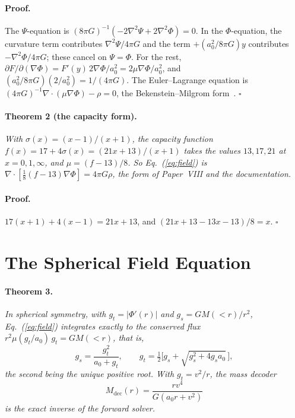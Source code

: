 \documentclass[twocolumn]{iopjournal}
\begin{document}
\paragraph{Proof.} The $\Psi$-equation is
$(8\pi G)^{-1}(-2\nabla^2\Psi + 2\nabla^2\Phi) = 0$. In the
$\Phi$-equation, the curvature term contributes $\nabla^2\Psi/4\pi G$
and the term $+(a_0^2/8\pi G)y$ contributes $-\nabla^2\Phi/4\pi G$;
these cancel on $\Psi = \Phi$. For the rest, $\partial F/\partial(\nabla\Phi) =
F'(y)\,2\nabla\Phi/a_0^2 = 2\mu\nabla\Phi/a_0^2$, and
$(a_0^2/8\pi G)(2/a_0^2) = 1/(4\pi G)$. The Euler--Lagrange equation is
$(4\pi G)^{-1}\nabla\cdot(\mu\nabla\Phi) - \rho = 0$, the Bekenstein--Milgrom form~\cite{BekensteinMilgrom1984}. \hfill $\square$

\paragraph{Theorem 2 (the capacity form).} \textit{With
$\sigma(x) = (x-1)/(x+1)$, the capacity function
$f(x) = 17 + 4\sigma(x) = (21x+13)/(x+1)$ takes the values $13, 17, 21$
at $x = 0, 1, \infty$, and $\mu = (f - 13)/8$. So
Eq.~(\ref{eq:field}) is
$\nabla\cdot[\tfrac18(f - 13)\nabla\Phi] = 4\pi G\rho$, the form of
Paper~VIII and the documentation.}

\paragraph{Proof.} $17(x+1) + 4(x-1) = 21x + 13$, and
$(21x + 13 - 13x - 13)/8 = x$. \hfill $\square$


\section*{The Spherical Field Equation}

\paragraph{Theorem 3.} \textit{In spherical symmetry, with
$g_t = |\Phi'(r)|$ and $g_s = GM({<}r)/r^2$, Eq.~(\ref{eq:field})
integrates exactly to the conserved flux $r^2\mu(g_t/a_0)\,g_t = GM({<}r)$,
that is,}
\begin{equation}
  g_s = \frac{g_t^2}{a_0 + g_t},\qquad
  g_t = \tfrac12\Big[g_s + \sqrt{g_s^2 + 4g_s a_0}\,\Big],
\label{eq:spherical}
\end{equation}
\textit{the second being the unique positive root. With $g_t = v^2/r$,
the mass decoder}
\begin{equation}
  M_{\mathrm{dec}}(r) = \frac{r v^4}{G(a_0 r + v^2)}
\end{equation}
\textit{is the exact inverse of the forward solver.}
\end{document}
